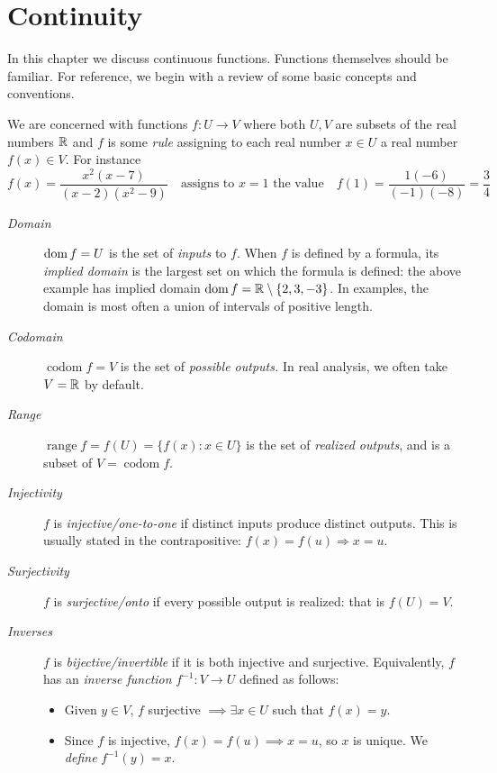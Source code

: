 \graphicspath{{4cont/asy/}}

\thispagestyle{empty}

\setcounter{section}{3}
\section{Continuity}\label{chap:cont}

In this chapter we discuss continuous functions. Functions themselves should be familiar. For reference, we begin with a review of some basic concepts and conventions.\medbreak

We are concerned with functions $f:U\to V$ where both $U,V$ are subsets of the real numbers $\mathbb{R}$ and $f$ is some \emph{rule} assigning to each real number $x\in U$ a real number $f(x)\in V$. For instance
\[
	f(x)=\frac {x^2(x-7)}{(x-2)(x^2-9)} 
	\quad\text{assigns to $x=1$ the value}\quad 
	f(1)=\frac{1(-6)}{(-1)(-8)}=\frac 34
\]
\begin{description}
	\item[\normalfont\emph{Domain}] $\operatorname{dom} f=U$ is the set of \emph{inputs} to $f$. When $f$ is defined by a formula, its \emph{implied domain} is the largest set on which the formula is defined: the above example has implied domain $\operatorname{dom} f=\mathbb{R}\setminus\{2,3,-3\}$. In examples, the domain is most often a union of intervals of positive length.
	\item[\normalfont\emph{Codomain}] $\operatorname{codom}f=V$ is the set of \emph{possible outputs.} In real analysis, we often take $V=\mathbb{R}$ by default.
	\item[\normalfont\emph{Range}] $\operatorname{range}f=f(U)=\bigl\{f(x):x\in U\bigr\}$ is the set of \emph{realized outputs}, and is a subset of $V=\operatorname{codom}f$.
	\item[\normalfont\emph{Injectivity}] $f$ is \emph{injective/one-to-one} if distinct inputs produce distinct outputs. This is usually stated in the contrapositive: $f(x)=f(u)\Longrightarrow x=u$.
	\item[\normalfont\emph{Surjectivity}] $f$ is \emph{surjective/onto} if every possible output is realized: that is $f(U)=V$.
	\item[\normalfont\emph{Inverses}] $f$ is \emph{bijective/invertible} if it is both injective and surjective. Equivalently, $f$ has an \emph{inverse function} $f^{-1}:V\to U$ defined as follows:
	\begin{itemize}
	  \item Given $y\in V$, $f$ surjective $\implies \exists x\in U$ such that $f(x)=y$.
	  \item Since $f$ is injective, $f(x)=f(u)\implies x=u$, so $x$ is unique. We \emph{define} $f^{-1}(y)=x$. 
	\end{itemize}
\end{description}

